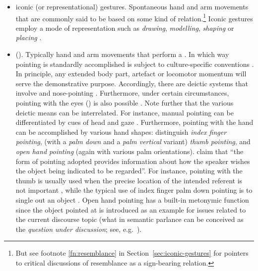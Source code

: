\documentclass[output=paper
                ,modfonts
                ,nonflat
	        ,collection
	        ,collectionchapter
	        ,collectiontoclongg
 	        ,biblatex
                ,babelshorthands
                ,newtxmath
                ,draftmode
                ,colorlinks, citecolor=brown
]{./langsci/langscibook}
\begin{document}
\begin{itemize}
\item iconic (or representational)   gestures. Spontaneous hand and arm movements that are commonly said to be based on some kind of   relation.\footnote{But see footnote \ref{fn:resemblance} in Section~\ref{sec:iconic-gestures} for pointers to critical discussions of resemblance as a sign-bearing relation.} Iconic gestures employ a mode of representation such as \textit{drawing}, \textit{modelling}, \textit{shaping} or \textit{placing} \citep{Streeck:2008,Mueller:1998}.
\item {} (). Typically hand and arm movements that perform a . 
%
In which way pointing is standardly accomplished is subject to culture-specific conventions \citep{Wilkins:2003}. 
%
In principle, any extended body part, artefact or locomotor momentum will serve the demonstrative purpose. 
%
Accordingly, there are deictic systems that involve  \citep{Enfield:2001} and nose-pointing \citep{Cooperrider:Nunez:2012}. 
%
Furthermore, under certain circumstances, pointing with the eyes () is also possible \citep{Hadjikhani:Hoge:Snyder:de:Gelder:2008}. 
%
Note further that the various deictic means can be interrelated. For instance, manual pointing can be differentiated by cues of head and gaze \citep{Butterworth:Itakura:2000}.
%
Furthermore, pointing with the hand can be accomplished by various hand shapes: \citet{Kendon:Versante:2003} distinguish \emph{index finger pointing},  (with a \emph{palm down}  and a \emph{palm vertical}  variant) \emph{thumb pointing},  and \emph{open hand pointing}  (again with various palm orientations).
%
\citet[]{Kendon:Versante:2003} claim that \enquote{the form of pointing adopted provides information about how the speaker wishes the object being indicated to be regarded}.
%
For instance, pointing with the thumb is usually used when the precise location of the intended referent is not important \citep[--125]{Kendon:Versante:2003}, while the typical use of index finger palm down pointing is to single out an object \citep[]{Kendon:Versante:2003}. 
%
Open hand pointing has a built-in metonymic function since the object pointed at is introduced as an example for issues related to the current discourse topic (what in semantic parlance can be conceived as the \emph{question under discussion}; see, e.g.\ \citealp{Ginzburg:2012}).

\end{itemize}
\end{document}
